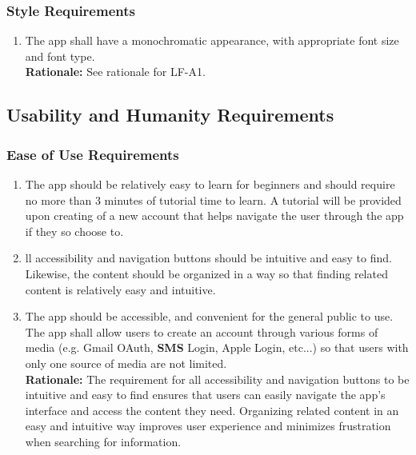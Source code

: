 \documentclass[]{article}
\begin{document}
\subsubsection{Style Requirements}
\label{ssub:style_requirements}
\begin{enumerate}[{LF-S}1. ]
	\item The app shall have a monochromatic appearance, with appropriate font size and font type.\\
	{\bf Rationale:} See rationale for LF-A1.
\end{enumerate}


\subsection{Usability and Humanity Requirements}
\label{sub:usability_and_humanity_requirements}

\subsubsection{Ease of Use Requirements}
\label{ssub:ease_of_use_requirements}
\begin{enumerate}[{UH-EOU}1. ]
	\item The app should be relatively easy to learn for beginners and should require no more than 3 minutes of tutorial time to learn. A tutorial will be provided upon creating of a new account that helps navigate the user through the app if they so choose to.
	\item ll accessibility and navigation buttons should be intuitive and easy to find. Likewise, the content should be organized in a way so that finding related content is relatively easy and intuitive.
	\item The app should be accessible, and convenient for the general public to use. The app shall allow users to create an account through various forms of media (e.g. Gmail OAuth, \textbf{SMS} Login, Apple Login, etc...) so that users with only one source of media are not limited.\\
	{\bf Rationale:} The requirement for all accessibility and navigation buttons to be intuitive and easy to find ensures that users can easily navigate the app's interface and access the content they need. Organizing related content in an easy and intuitive way improves user experience and minimizes frustration when searching for information.
\end{enumerate}
\end{document}
